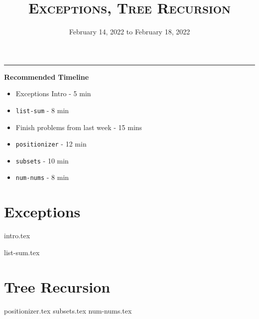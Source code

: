 \documentclass{exam}
\title{\textsc{Exceptions, Tree Recursion}}
\date{February 14, 2022 to February 18, 2022}
\begin{document}
\maketitle
\rule{\textwidth}{0.15em}
\fontsize{12}{15}\selectfont

\begin{guide}
\begin{blocksection}
    \textbf{Recommended Timeline}
    \begin{itemize}
  	\item Exceptions Intro - 5 min
        \item \lstinline{list-sum} - 8 min
  	\item Finish problems from last week - 15 mins
  	\item \lstinline{positionizer} - 12 min
  	\item \lstinline{subsets} - 10 min
  	\item \lstinline{num-nums} - 8 min
    \end{itemize}
\end{blocksection}
\newpage
\end{guide}



\newpage
\section{Exceptions}
{intro.tex}
\begin{questions}
{list-sum.tex}
\end{questions}

\pagebreak

\section{Tree Recursion}
\begin{questions}
{positionizer.tex}
{subsets.tex}
{num-nums.tex}
\end{questions}

\end{document}
